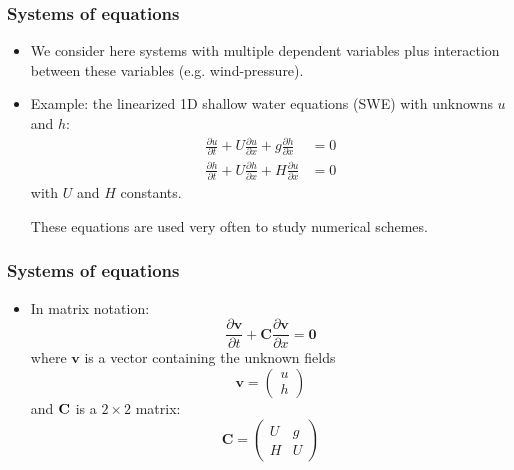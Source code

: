 \documentclass[aspectratio=43,9pt]{beamer}
\begin{document}
\begin{frame}
	\frametitle{Systems of equations}
	\begin{itemize}
		\item We consider here systems with multiple dependent variables plus interaction between these variables (e.g. wind-pressure).\\[4ex]
		\item Example: the linearized 1D shallow water equations (SWE) with unknowns $u$ and $h$:
			\begin{align*}
				\frac{\partial u}{\partial t} + U \frac{\partial u}{\partial x} + g \frac{\partial h}{\partial x} &= 0 \\
				\frac{\partial h}{\partial t} + U \frac{\partial h}{\partial x} + H \frac{\partial u}{\partial x} &= 0
			\end{align*}
			with $U$ and $H$ constants.
			\par\vspace*{2ex}
			These equations are used very often to study numerical schemes.
	\end{itemize}
\end{frame}
%
%
\begin{frame}
	\frametitle{Systems of equations}
	\begin{itemize}
		\item In matrix notation:
			\begin{equation*}
				\frac{\partial \bm v}{\partial t}+\bm C\frac{\partial \bm v}{\partial x}=\bm 0
			\end{equation*}
			where $\bm v$ is a vector containing the unknown fields
			\begin{equation*}
				\bm v=\left(\begin{array}{c}u\\h\end{array}\right)
			\end{equation*}
			and $\bf C$ is a $2\times2$ matrix:
			\begin{equation*}
				\bm C=\left(\begin{array}{cc}U & g\\H &U\end{array}\right)
			\end{equation*}
	\end{itemize}
\end{frame}
%
\end{document}

